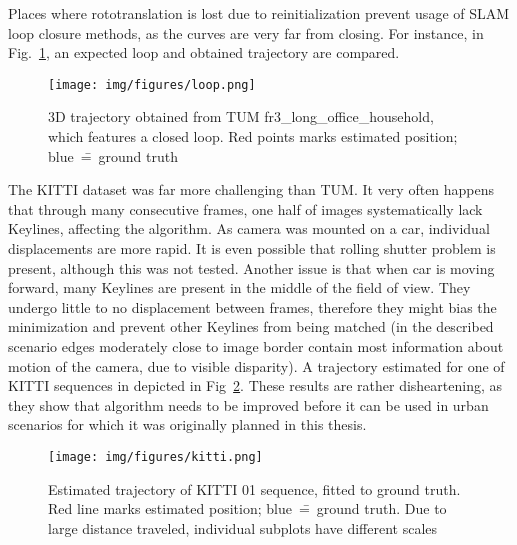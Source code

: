 Places where rototranslation is lost due to reinitialization prevent usage of SLAM loop closure methods, as the curves are very far from closing. For instance, in Fig.~\ref{fig:loop}, an expected loop and obtained trajectory are compared.

\begin{figure}[ht]
	\centering\texttt{[image: img/figures/loop.png]}
	\caption{ 3D trajectory obtained from TUM fr3\_long\_office\_household, which features a closed loop. Red points marks estimated position; blue~\==~ground truth }
	\label{fig:loop}
\end{figure}


The KITTI dataset was far more challenging than TUM. It very often happens that through many consecutive frames, one half of images systematically lack Keylines, affecting the algorithm. As camera was mounted on a car, individual displacements are more rapid. It is even possible that rolling shutter problem is present, although this was not tested. Another issue is that when car is moving forward, many Keylines are present in the middle of the field of view. They undergo little to no displacement between frames, therefore they might bias the minimization and prevent other Keylines from being matched (in the described scenario edges moderately close to image border contain most information about motion of the camera, due to visible disparity). A trajectory estimated for one of KITTI sequences in depicted in Fig~\ref{fig:kitti_3}. These results are rather disheartening, as they show that algorithm needs to be improved before it can be used in urban scenarios for which it was originally planned in this thesis.



\begin{figure}[ht]
	\centering\texttt{[image: img/figures/kitti.png]}
	\caption{ Estimated trajectory of KITTI 01 sequence, fitted to ground truth. Red line marks estimated position; blue~\==~ground truth. Due to large distance traveled, individual subplots have different scales }
	\label{fig:kitti_3}
\end{figure}















